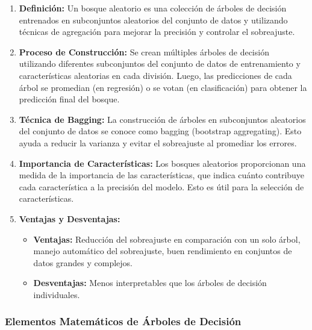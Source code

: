 \documentclass[12pt]{article}
\begin{document}
\begin{enumerate}
    \item \textbf{Definición:}
        Un bosque aleatorio es una colección de árboles de decisión entrenados en subconjuntos aleatorios del conjunto de datos y utilizando técnicas de agregación para mejorar la precisión y controlar el sobreajuste.

    \item \textbf{Proceso de Construcción:}
        Se crean múltiples árboles de decisión utilizando diferentes subconjuntos del conjunto de datos de entrenamiento y características aleatorias en cada división. Luego, las predicciones de cada árbol se promedian (en regresión) o se votan (en clasificación) para obtener la predicción final del bosque.

    \item \textbf{Técnica de Bagging:}
        La construcción de árboles en subconjuntos aleatorios del conjunto de datos se conoce como bagging (bootstrap aggregating). Esto ayuda a reducir la varianza y evitar el sobreajuste al promediar los errores.

    \item \textbf{Importancia de Características:}
        Los bosques aleatorios proporcionan una medida de la importancia de las características, que indica cuánto contribuye cada característica a la precisión del modelo. Esto es útil para la selección de características.

    \item \textbf{Ventajas y Desventajas:}
        \begin{itemize}
            \item \textbf{Ventajas:} Reducción del sobreajuste en comparación con un solo árbol, manejo automático del sobreajuste, buen rendimiento en conjuntos de datos grandes y complejos.
            \item \textbf{Desventajas:} Menos interpretables que los árboles de decisión individuales.
        \end{itemize}
\end{enumerate}

\subsubsection{Elementos Matemáticos de Árboles de Decisión}
\end{document}
